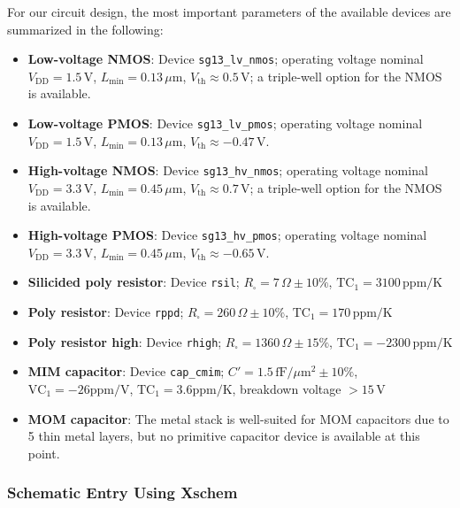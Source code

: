 \documentclass[
  a4paper,
  DIV=11,
  numbers=noendperiod]{scrartcl}
\providecommand{\tightlist}{%
  \setlength{\itemsep}{0pt}\setlength{\parskip}{0pt}}\usepackage{longtable,booktabs,array}
\begin{document}
For our circuit design, the most important parameters of the available
devices are summarized in the following:

\begin{itemize}
\tightlist
\item
  \textbf{Low-voltage NMOS}: Device \texttt{sg13\_lv\_nmos}; operating
  voltage nominal \(V_\mathrm{DD}=1.5\,\text{V}\),
  \(L_\mathrm{min}=0.13\,\mu\text{m}\),
  \(V_\mathrm{th}\approx 0.5\,\text{V}\); a triple-well option for the
  NMOS is available.
\item
  \textbf{Low-voltage PMOS}: Device \texttt{sg13\_lv\_pmos}; operating
  voltage nominal \(V_\mathrm{DD}=1.5\,\text{V}\),
  \(L_\mathrm{min}=0.13\,\mu\text{m}\),
  \(V_\mathrm{th}\approx -0.47\,\text{V}\).
\item
  \textbf{High-voltage NMOS}: Device \texttt{sg13\_hv\_nmos}; operating
  voltage nominal \(V_\mathrm{DD}=3.3\,\text{V}\),
  \(L_\mathrm{min}=0.45\,\mu\text{m}\),
  \(V_\mathrm{th}\approx 0.7\,\text{V}\); a triple-well option for the
  NMOS is available.
\item
  \textbf{High-voltage PMOS}: Device \texttt{sg13\_hv\_pmos}; operating
  voltage nominal \(V_\mathrm{DD}=3.3\,\text{V}\),
  \(L_\mathrm{min}=0.45\,\mu\text{m}\),
  \(V_\mathrm{th}\approx -0.65\,\text{V}\).
\item
  \textbf{Silicided poly resistor}: Device \texttt{rsil};
  \(R_\square=7\,\Omega \pm 10\%\), \(\text{TC}_1=3100\,\text{ppm/K}\)
\item
  \textbf{Poly resistor}: Device \texttt{rppd};
  \(R_\square=260\,\Omega \pm 10\%\), \(\text{TC}_1=170\,\text{ppm/K}\)
\item
  \textbf{Poly resistor high}: Device \texttt{rhigh};
  \(R_\square=1360\,\Omega \pm 15\%\),
  \(\text{TC}_1=-2300\,\text{ppm/K}\)
\item
  \textbf{MIM capacitor}: Device \texttt{cap\_cmim};
  \(C'=1.5\,\text{fF}/\mu\text{m}^2 \pm 10\%\),
  \(\text{VC}_1=-26\text{ppm/V}\), \(\text{TC}_1=3.6\text{ppm/K}\),
  breakdown voltage \(>15\,\text{V}\)
\item
  \textbf{MOM capacitor}: The metal stack is well-suited for MOM
  capacitors due to 5 thin metal layers, but no primitive capacitor
  device is available at this point.
\end{itemize}

\subsubsection{Schematic Entry Using
Xschem}\label{schematic-entry-using-xschem}
\end{document}
